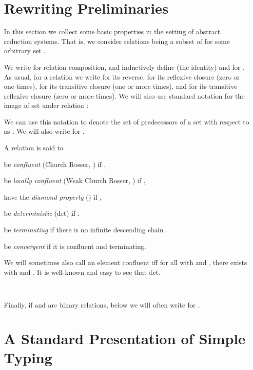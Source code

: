 \documentclass{LMCS}
\begin{document}
\section{Rewriting Preliminaries}
\label{sec:rewriting-prelim}

In this section we collect some basic properties in the setting of
abstract reduction systems.  That is, we consider relations 
being a subset of  for some arbitrary set .

We write  for relation composition, and inductively define
 (the identity) and  for .
As usual, for a relation  we write  for its reverse,
 for its reflexive closure (zero or one times),
 for its transitive closure
(one or more times), and  for its
transitive reflexive closure (zero or more times).  We will also
use standard notation  for the image of set  under relation :

\noindent We can use this notation to denote the set of predecessors
of a set  with respect to  as .  We will also
write  for .

\vspace{3mm}
\noindent A relation  is said to
\begin{iteMize}{}
\item be {\em confluent}
(Church Rosser, ) if ,
\item be {\em locally confluent}
(Weak Church Rosser, ) if ,
\item have the {\em diamond property}
() if ,
\item be {\em deterministic} (det) if .
\item be {\em terminating} if there is no infinite descending chain .
\item be {\em convergent} if it is confluent and terminating.
\end{iteMize}

\noindent We will sometimes also call an element  confluent
iff for all  with  and ,
there exists  with  and .  It is
well-known and easy to see that det.

\ 

\noindent Finally, if  and  are binary relations, below
we will often write  for .

\section{A Standard Presentation of Simple Typing}
\label{sec:std-presentation}
\end{document}

